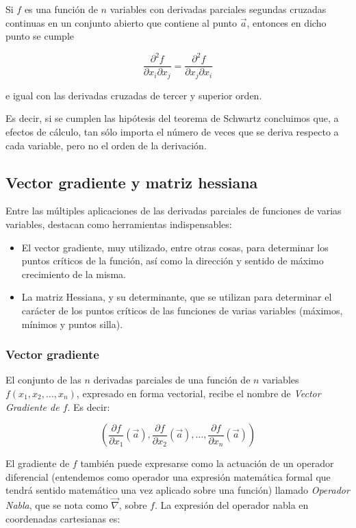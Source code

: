 Si $f$ es una función de $n$ variables con derivadas parciales
segundas cruzadas continuas en un conjunto abierto que contiene al
punto $\vec{a}$, entonces en dicho punto se cumple

\[
\frac{{\partial ^2 f}} {{\partial x_i \partial x_j }} =
\frac{{\partial ^2 f}} {{\partial x_j \partial x_i }}
\]

e igual con las derivadas cruzadas de tercer y superior orden.

Es decir, si se cumplen las hipótesis del teorema de Schwartz
concluimos que, a efectos de cálculo, tan sólo importa el número de
veces que se deriva respecto a cada variable, pero no el orden de la
derivación.

\subsection{Vector gradiente y matriz hessiana}

Entre las múltiples aplicaciones de las derivadas parciales de
funciones de varias variables, destacan como herramientas
indispensables:

\begin{itemize}

\item El vector gradiente, muy utilizado, entre otras cosas, para determinar los puntos críticos de la
función, así como la dirección y sentido de máximo crecimiento de la
misma.

\item La matriz Hessiana, y su determinante, que se utilizan para
determinar el carácter de los puntos críticos de las funciones de
varias variables (máximos, mínimos y puntos silla).
\end{itemize}

\subsubsection*{Vector gradiente}
El conjunto de las $n$ derivadas parciales de una función de $n$
variables $f(x_1,x_2,\ldots,x_n)$, expresado en forma vectorial,
recibe el nombre de \emph{Vector Gradiente de $f$}. Es decir:

\[
\left(\frac{\partial f}{\partial x_1}(\vec a),\frac{\partial
f}{\partial x_2}(\vec a),\ldots,\frac{\partial f}{\partial x_n}(\vec
a)\right)
\]

El gradiente de $f$ también puede expresarse como la actuación de un
operador diferencial (entendemos como operador una expresión
matemática formal que tendrá sentido matemático una vez aplicado
sobre una función) llamado \emph{Operador Nabla}, que se nota como
$\vec\nabla$, sobre $f$. La expresión del operador nabla en
coordenadas cartesianas es:

